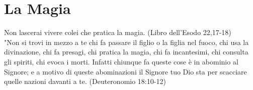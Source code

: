 \documentclass[12pt,a4paper,twoside,openany]{book}
\begin{document}
\pagebreak

\section{La Magia}

\begin{changemargin}{0.3cm}{0.3cm}\begin{enfasi}{
Non lascerai vivere colei che pratica la magia. (Libro dell'Esodo 22,17-18)\\

"Non si trovi in mezzo a te chi fa passare il figlio o la figlia nel fuoco, chi usa la divinazione, chi fa presagi, chi pratica la magia, chi fa incantesimi, chi consulta gli spiriti, chi evoca i morti. Infatti chiunque fa queste cose è in abominio al Signore; e a motivo di queste abominazioni il Signore tuo Dio sta per scacciare quelle nazioni davanti a te. (Deuteronomio 18:10-12) 
} \end{enfasi}\end{changemargin}
\end{document}
